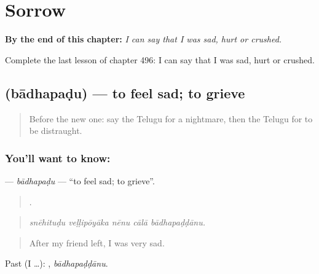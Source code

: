 
\chapter{Sorrow}
\label{ch:te-sorrow}

\begin{chapteropening}
\textbf{By the end of this chapter:} \emph{I can say that I was sad, hurt or crushed.}

Complete the last lesson of chapter 496: I can say that I was sad, hurt or crushed.
\end{chapteropening}

\section[\texorpdfstring{\te{బాధపడు} (bādhapaḍu)}{బాధపడు (bādhapaḍu)}]{ (bādhapaḍu) — to feel sad; to grieve}

\label{lesson:TE-C496-badhapadu}



\begin{quote}
Before the new one: say the Telugu for a nightmare, then the Telugu for to be distraught.
\end{quote}

\subsection*{You'll want to know: }
\textbf{} — \emph{bādhapaḍu} — \textquotedblleft{}to feel sad; to grieve\textquotedblright{}.

\begin{quote}
    .
\end{quote}

\begin{quote}
\emph{snēhituḍu veḷḷipōyāka nēnu cālā bādhapaḍḍānu.}
\end{quote}

\begin{quote}
After my friend left, I was very sad.
\end{quote}

Past (I …): , \emph{bādhapaḍḍānu}.

